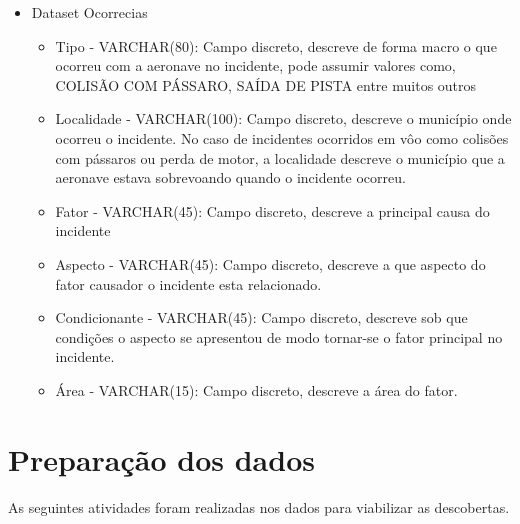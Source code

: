 \documentclass[conference]{IEEEtran}
\begin{document}
\begin{itemize}
 \item Dataset Ocorrecias
 \begin{itemize}
  \item Tipo - VARCHAR(80): Campo discreto, descreve de forma macro o que ocorreu com a aeronave no incidente, pode assumir valores como, COLISÃO COM PÁSSARO, SAÍDA DE PISTA
  entre muitos outros
  \item Localidade - VARCHAR(100): Campo discreto, descreve o município onde ocorreu o incidente. No caso de incidentes ocorridos em vôo como colisões com pássaros ou perda de
  motor, a localidade descreve o município que a aeronave estava sobrevoando quando o incidente ocorreu.
  \item Fator - VARCHAR(45): Campo discreto, descreve a principal causa do incidente
  \item Aspecto - VARCHAR(45): Campo discreto, descreve a que aspecto do fator causador o incidente esta relacionado.
  \item Condicionante - VARCHAR(45): Campo discreto, descreve sob que condições o aspecto se apresentou de modo tornar-se o fator principal no incidente. 
  \item Área - VARCHAR(15): Campo discreto, descreve a área do fator. \\
 \end{itemize}
 
\end{itemize}

\section{Preparação dos dados}

As seguintes atividades foram realizadas nos dados para viabilizar as descobertas.
\end{document}
